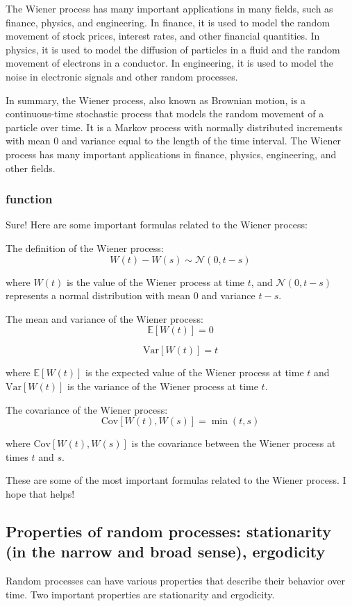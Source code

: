 \documentclass[12pt, a4paper, oneside]{article}
\begin{document}
The Wiener process has many important applications in many fields, such as finance, physics, and engineering. In finance, it is used to model the random movement of stock prices, interest rates, and other financial quantities. In physics, it is used to model the diffusion of particles in a fluid and the random movement of electrons in a conductor. In engineering, it is used to model the noise in electronic signals and other random processes.

In summary, the Wiener process, also known as Brownian motion, is a continuous-time stochastic process that models the random movement of a particle over time. It is a Markov process with normally distributed increments with mean 0 and variance equal to the length of the time interval. The Wiener process has many important applications in finance, physics, engineering, and other fields.
\subsubsection{function}
Sure! Here are some important formulas related to the Wiener process:

The definition of the Wiener process:
$$ W(t) - W(s) \sim \mathcal{N}(0,t-s) $$

where $W(t)$ is the value of the Wiener process at time $t$, and $\mathcal{N}(0,t-s)$ represents a normal distribution with mean 0 and variance $t-s$.

The mean and variance of the Wiener process:
$$ \mathbb{E}[W(t)] = 0 $$

$$ \text{Var}[W(t)] = t $$

where $\mathbb{E}[W(t)]$ is the expected value of the Wiener process at time $t$ and $\text{Var}[W(t)]$ is the variance of the Wiener process at time $t$.

The covariance of the Wiener process:
$$ \text{Cov}[W(t),W(s)] = \min(t,s) $$

where $\text{Cov}[W(t),W(s)]$ is the covariance between the Wiener process at times $t$ and $s$.

These are some of the most important formulas related to the Wiener process. I hope that helps!


\subsection{ Properties of random processes: stationarity (in the narrow and broad sense), ergodicity }
Random processes can have various properties that describe their behavior over time. Two important properties are stationarity and ergodicity.
\end{document}
